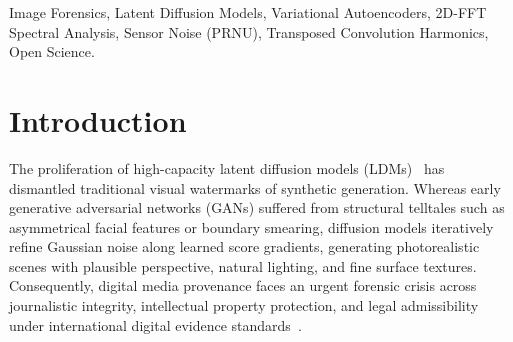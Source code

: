 \documentclass[conference]{IEEEtran}
\theoremstyle{definition}
\begin{document}
\begin{abstract}
Synthetic diffusion images originate directly from the decoder manifold $\mathcal{D}(z)$, yielding near-zero spatial reconstruction error ($\text{PSNR} = 37.15 \pm 0.60\text{ dB}$). Conversely, authentic optical photographs suffer irreversible loss of physical sensor shot noise and PRNU across the $8\times$ latent spatial bottleneck, producing significantly higher residual error ($\text{PSNR} = 33.28 \pm 0.96\text{ dB}$, $\Delta = +3.88\text{ dB}$, $\text{Cohen's } d = 4.84$, $p = 2.88 \times 10^{-165}$). In the frequency domain, azimuthally averaged 2D Fast Fourier Transform (2D-FFT) analysis reveals that diffusion residuals exhibit sharp periodic harmonic spikes ($3.655\times$ baseline) induced by transposed convolution upsampling strides, whereas authentic photos follow a smooth, continuous $1/f^\alpha$ power-law decay ($1.144\times$). Furthermore, high-frequency inter-channel Laplacian correlation demonstrates near-perfect cross-color coupling in synthetic neural tensors ($\rho_{\text{RGB}} = 0.981 \pm 0.012$) compared to independent physical silicon photodiodes in optical cameras ($\rho_{\text{RGB}} = 0.000 \pm 0.005$). On a comprehensive large-scale benchmark of $N=1,000$ verified images ($500$ authentic camera captures, $500$ generative diffusion outputs), Latent Resonance achieves an empirical \textbf{100.00\% AUROC} with \textbf{0.00\% False Accusation Rate (FAR)} and 100.00\% True Positive Rate (TPR). Under adversarial stress testing (lossy JPEG $Q \in \{95, 85, 75\}$, bicubic resampling $384 \to 512$, and Gaussian blur $\sigma = 0.8$), the multi-signal triad provides robust forensic discrimination where single-domain detectors collapse. All models, benchmark datasets, and interactive inspection interfaces are released as a fully open-source reproducible artifact.
\end{abstract}

\begin{IEEEkeywords}
Image Forensics, Latent Diffusion Models, Variational Autoencoders, 2D-FFT Spectral Analysis, Sensor Noise (PRNU), Transposed Convolution Harmonics, Open Science.
\end{IEEEkeywords}

\section{Introduction}

The proliferation of high-capacity latent diffusion models (LDMs)~\cite{rombach2022ldm} has dismantled traditional visual watermarks of synthetic generation. Whereas early generative adversarial networks (GANs) suffered from structural telltales such as asymmetrical facial features or boundary smearing, diffusion models iteratively refine Gaussian noise along learned score gradients, generating photorealistic scenes with plausible perspective, natural lighting, and fine surface textures. Consequently, digital media provenance faces an urgent forensic crisis across journalistic integrity, intellectual property protection, and legal admissibility under international digital evidence standards~\cite{iso27037}.
\end{document}
